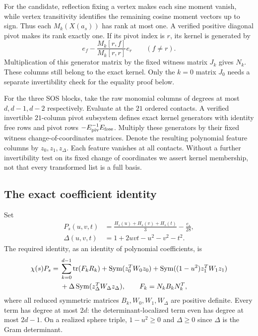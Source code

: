 \documentclass[12pt,reqno]{amsart}
\theoremstyle{definition}
\numberwithin{equation}{section}
\begin{document}
For the candidate, reflection fixing a vertex makes each sine moment vanish, while vertex transitivity identifies the remaining cosine moment vectors up to sign. Thus each $M_k(X(a_s))$ has rank at most one. A verified positive diagonal pivot makes its rank exactly one. If its pivot index is $r$, its kernel is generated by
\begin{equation}\label{finite73:momentkernel}
 e_f-\frac{M_k[r,f]}{M_k[r,r]}e_r\qquad(f\ne r).
\end{equation}
Multiplication of this generator matrix by the fixed witness matrix $J_k$ gives $N_k$. These columns still belong to the exact kernel. Only the $k=0$ matrix $J_0$ needs a separate invertibility check for the equality proof below.

For the three SOS blocks, take the raw monomial columns of degrees at most $d,d-1,d-2$ respectively. Evaluate at the $21$ ordered contacts. A verified invertible $21$-column pivot subsystem defines exact kernel generators with identity free rows and pivot rows $-E_{\rm piv}^{-1}E_{\rm free}$. Multiply these generators by their fixed witness change-of-coordinates matrices. Denote the resulting polynomial feature columns by $z_0,z_1,z_\Delta$. Each feature vanishes at all contacts. Without a further invertibility test on its fixed change of coordinates we assert kernel membership, not that every transformed list is a full basis.

\subsection{The exact coefficient identity}
Set
\begin{equation}\label{finite73:target}
\begin{aligned}
 P_s(u,v,t)&=\frac{H_s(u)+H_s(v)+H_s(t)}3-\frac{e_s}{28},\\
 \Delta(u,v,t)&=1+2uvt-u^2-v^2-t^2.
\end{aligned}
\end{equation}
The required identity, as an identity of polynomial coefficients, is
\begin{align}\label{finite73:identity}
 \chi(s)P_s={}&\sum_{k=0}^{d-1}\operatorname{tr}(F_kR_k)
 +\operatorname{Sym}(z_0^TW_0z_0)
 +\operatorname{Sym}((1-u^2)z_1^TW_1z_1)\notag\\
 &+\Delta\operatorname{Sym}(z_\Delta^TW_\Delta z_\Delta),
 \qquad F_k=N_kB_kN_k^T,
\end{align}
where all reduced symmetric matrices $B_k,W_0,W_1,W_\Delta$ are positive definite. Every term has degree at most $2d$: the determinant-localized term even has degree at most $2d-1$. On a realized sphere triple, $1-u^2\geq0$ and $\Delta\geq0$ since $\Delta$ is the Gram determinant.
\end{document}
